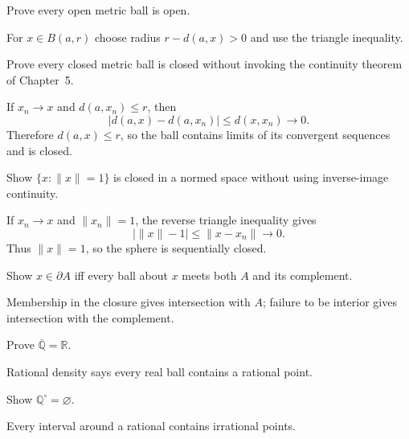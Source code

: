 \begin{problem}\label{prob:ii04-problem-02}
Prove every open metric ball is open.
\end{problem}
\begin{solution}
For $x\in B(a,r)$ choose radius $r-d(a,x)>0$ and use the triangle inequality.
\end{solution}

\begin{problem}\label{prob:ii04-problem-03}
Prove every closed metric ball is closed without invoking the continuity theorem of Chapter~5.
\end{problem}
\begin{solution}
If $x_n\to x$ and $d(a,x_n)\le r$, then
\[
|d(a,x)-d(a,x_n)|\le d(x,x_n)\to0.
\]
Therefore $d(a,x)\le r$, so the ball contains limits of its convergent sequences and is closed.
\end{solution}

\begin{problem}\label{prob:ii04-problem-04}
Show $\{x:\|x\|=1\}$ is closed in a normed space without using inverse-image continuity.
\end{problem}
\begin{solution}
If $x_n\to x$ and $\|x_n\|=1$, the reverse triangle inequality gives
\[
|\|x\|-1|\le\|x-x_n\|\to0.
\]
Thus $\|x\|=1$, so the sphere is sequentially closed.
\end{solution}

\begin{problem}\label{prob:ii04-problem-05}
Show $x\in\partial A$ iff every ball about $x$ meets both $A$ and its complement.
\end{problem}
\begin{solution}
Membership in the closure gives intersection with $A$; failure to be interior gives intersection with the complement.
\end{solution}

\begin{problem}\label{prob:ii04-problem-06}
Prove $\overline{\mathbb Q}=\mathbb R$.
\end{problem}
\begin{solution}
Rational density says every real ball contains a rational point.
\end{solution}

\begin{problem}\label{prob:ii04-problem-07}
Show $\mathbb Q^\circ=\varnothing$.
\end{problem}
\begin{solution}
Every interval around a rational contains irrational points.
\end{solution}

